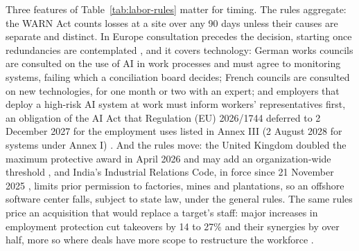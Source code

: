 Three features of Table~\ref{tab:labor-rules} matter for timing. The rules aggregate: the WARN Act counts losses at a site over any 90 days unless their causes are separate and distinct. In Europe consultation precedes the decision, starting once redundancies are contemplated \citep{cjeu2009akavan}, and it covers technology: German works councils are consulted on the use of AI in work processes and must agree to monitoring systems, failing which a conciliation board decides; French councils are consulted on new technologies, for one month or two with an expert; and employers that deploy a high-risk AI system at work must inform workers' representatives first, an obligation of the AI Act that Regulation (EU) 2026/1744 deferred to 2 December 2027 for the employment uses listed in Annex III (2 August 2028 for systems under Annex I) \citep{eu2024regulation,eu2026regulation}. And the rules move: the United Kingdom doubled the maximum protective award in April 2026 and may add an organization-wide threshold \citep{dbt2026threshold}, and India's Industrial Relations Code, in force since 21 November 2025 \citep{pib2025codes}, limits prior permission to factories, mines and plantations, so an offshore software center falls, subject to state law, under the general rules. The same rules price an acquisition that would replace a target's staff: major increases in employment protection cut takeovers by 14 to 27\% and their synergies by over half, more so where deals have more scope to restructure the workforce \citep{dessaint2017employment}.

